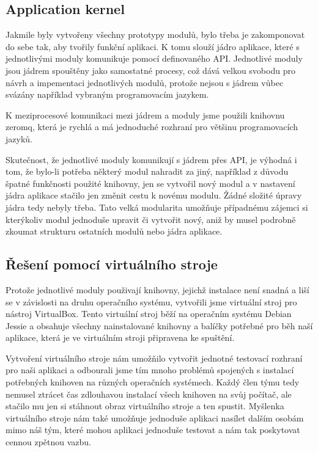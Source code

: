 \documentclass[12pt,a4paper]{article}
\begin{document}
\subsection*{Application kernel}
Jakmile byly vytvořeny všechny prototypy modulů, bylo třeba je zakomponovat do sebe tak, aby tvořily funkční aplikaci. K tomu slouží jádro aplikace, které s jednotlivými moduly komunikuje pomocí definovaného API. Jednotlivé moduly jsou jádrem spouštěny jako samostatné procesy, což dává velkou svobodu pro návrh a impementaci jednotlivých modulů, protože nejsou s jádrem vůbec svázány například vybraným programovacím jazykem.

K meziprocesové komunikaci mezi jádrem a moduly jsme použili knihovnu zeromq, která je rychlá a má jednoduché rozhraní pro většinu programovacích jazyků.

Skutečnost, že jednotlivé moduly komunikují s jádrem přes API, je výhodná i tom, že bylo-li potřeba některý modul nahradit za jiný, například z důvodu špatné funkčnosti použité knihovny, jen se vytvořil nový modul a v nastavení jádra aplikace stačilo jen změnit cestu k novému modulu. Žádné složité úpravy jádra tedy nebyly třeba. Tato velká modularita umožňuje případnému zájemci si kterýkoliv modul jednoduše upravit či vytvořit nový, aniž by musel podrobně zkoumat strukturu ostatních modulů nebo jádra aplikace.

\subsection*{Řešení pomocí virtuálního stroje}
Protože jednotlivé moduly použivají knihovny, jejichž instalace není snadná a liší se v závislosti na druhu operačního systému, vytvořili jsme virtuální stroj pro nástroj VirtualBox. Tento virtuální stroj běží na operačním systému Debian Jessie a obsahuje všechny nainstalované knihovny a balíčky potřebné pro běh naší aplikace, která je ve virtuálním stroji připravena ke spuštění. 

Vytvoření virtuálního stroje nám umožňilo vytvořit jednotné testovací rozhraní pro naši aplikaci a odbourali jsme tím mnoho problémů spojených s instalací potřebných knihoven na různých operačních systémech. Každý člen týmu tedy nemusel ztrácet čas zdlouhavou instalací všech knihoven na svůj počítač, ale stačilo mu jen si stáhnout obraz virtuálního stroje a ten spustit. Myšlenka virtuálního stroje nám také umožňuje jednoduše aplikaci nasílet dalším osobám mimo náš tým, které mohou aplikaci jednoduše testovat a nám tak poskytovat cennou zpětnou vazbu.
\end{document}
